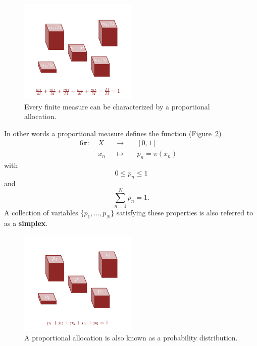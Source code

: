 \documentclass[
  letterpaper,
  DIV=11,
  numbers=noendperiod]{scrartcl}
\begin{document}
\begin{figure}

{\centering \includegraphics[width=0.5\textwidth,height=\textheight]{figures/proportional_measure/proportional_measure.pdf}

}

\caption{\label{fig-proportional}Every finite measure can be
characterized by a proportional allocation.}

\end{figure}

In other words a proportional measure defines the function
(Figure~\ref{fig-probability}) \begin{alignat*}{6}
\pi :\; & X & &\rightarrow& \; & [0, 1] &
\\
& x_{n} & &\mapsto& & p_{n} = \pi(x_{n}) &
\end{alignat*} with \[
0 \le p_{n} \le 1
\] and \[
\sum_{n = 1}^{N} p_{n} = 1.
\] A collection of variables \(\{ p_{1}, \ldots, p_{N} \}\) satisfying
these properties is also referred to as a \textbf{simplex}.

\begin{figure}

{\centering \includegraphics[width=0.5\textwidth,height=\textheight]{figures/probability_distribution/probability_distribution.pdf}

}

\caption{\label{fig-probability}A proportional allocation is also known
as a probability distribution.}

\end{figure}
\end{document}
